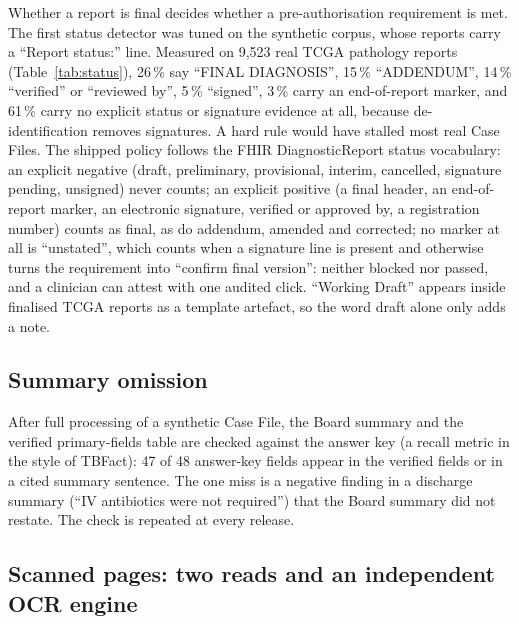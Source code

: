 \documentclass{article}
\newcommand{\pct}{\,\%}
\begin{document}
Whether a report is final decides whether a pre-authorisation requirement is met. The first status detector was tuned on the synthetic corpus, whose reports carry a ``Report status:'' line. Measured on 9,523 real TCGA pathology reports \citep{kefeli2024tcga} (Table~\ref{tab:status}), 26\pct{} say ``FINAL DIAGNOSIS'', 15\pct{} ``ADDENDUM'', 14\pct{} ``verified'' or ``reviewed by'', 5\pct{} ``signed'', 3\pct{} carry an end-of-report marker, and 61\pct{} carry no explicit status or signature evidence at all, because de-identification removes signatures. A hard rule would have stalled most real Case Files. The shipped policy follows the FHIR DiagnosticReport status vocabulary: an explicit negative (draft, preliminary, provisional, interim, cancelled, signature pending, unsigned) never counts; an explicit positive (a final header, an end-of-report marker, an electronic signature, verified or approved by, a registration number) counts as final, as do addendum, amended and corrected; no marker at all is ``unstated'', which counts when a signature line is present and otherwise turns the requirement into ``confirm final version'': neither blocked nor passed, and a clinician can attest with one audited click. ``Working Draft'' appears inside finalised TCGA reports as a template artefact, so the word draft alone only adds a note.

\begin{table}[htbp]
\centering\small
\caption{Status evidence found in 9,523 real TCGA pathology reports (a report can carry more than one marker).}
\label{tab:status}

\end{table}

\subsection{Summary omission}

After full processing of a synthetic Case File, the Board summary and the verified primary-fields table are checked against the answer key (a recall metric in the style of TBFact): 47 of 48 answer-key fields appear in the verified fields or in a cited summary sentence. The one miss is a negative finding in a discharge summary (``IV antibiotics were not required'') that the Board summary did not restate. The check is repeated at every release.

\subsection{Scanned pages: two reads and an independent OCR engine}
\label{sec:ocr}
\end{document}

